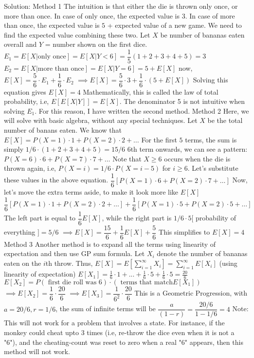\begin{enumerate}
Solution: Method 1
The intuition is that either the die is thrown only once, or more than once. In case of only once, the expected value is $3$.
In case of more than once, the expected value is $5$ + expected value of a new game. We need to find the expected value combining these two.
Let $X$ be number of bananas eaten overall  and $Y$ = number shown on the first dice.
$E_1 = E[X | \text{only once}] = E[X | Y < 6] = \dfrac{1}{5}(1+2+3+4+5) = 3$
$E_2 = E[ X | \text{more than once}] = E[X | Y=6] = 5 + E[X]$
now, $E[X] =  \dfrac{5}{6}\cdot E_1 + \dfrac{1}{6} \cdot E_2$
$\implies E[X] = \dfrac{5}{6} \cdot 3 + \dfrac{1}{6} \cdot (5 + E[X])$
Solving this equation gives $E[X] = 4$
Mathematically, this is called the law of total probability, i.e, $E[ E[X|Y] ] = E[X]$.
The denominator 5 is not intuitive when solving $E_1$. For this reason, I have written the second method.
Method 2
Here, we will solve with basic algebra, without any special techniques.
Let $X$ be the total number of banans eaten.
We know that $E[X]= P(X=1)\cdot 1 + P(X=2) \cdot 2 + \ldots$
For the first $5$ terms, the sum is simply $1/6 \cdot (1+2+3+4+5) = 15/6$
$6$th term onwards, we can see a pattern:
$P(X=6)  \cdot 6 + P(X=7) \cdot 7 + \ldots$
Note that $X\ge 6$ occurs when the die is thrown again, i.e, $P(X=i) = 1/6 \cdot P(X=i - 5)$ for $i\ge 6$.
Let's substitute these values in the above equation.
$ \dfrac{1}{6} [ P(X=1)  \cdot 6 + P(X=2) \cdot 7 + \ldots  ]$
Now, let's move the extra terms aside, to make it look more like $E[X]$
$ \dfrac{1}{6}  [ P(X=1) \cdot 1 + P(X=2) \cdot 2 + \ldots ]  + \dfrac{1}{6} [P(X=1) \cdot 5 + P(X=2) \cdot 5 + \ldots]$
The left part is equal to $\dfrac{1}{6} E[X]$, while the right part is $1/6 \cdot 5 [$ probability of everything $] = 5/6 $
$\implies  E[X] = \dfrac{15}{6} + \dfrac{1}{6}E[X] + \dfrac{5}{6}$
This simplifies to $E[X] = 4$
Method 3
Another method is to expand all the terms using linearity of expectation and then use GP sum formula.
Let $X_i$ denote the number of bananas eaten on the $i$th throw.
Thus, $E[X] = E[\sum_{i=1}^{\infty} X_i] = \sum_{i=1}^{\infty} E[X_i]$ (using linearity of expectation)
$E[X_1] = \frac{1}{6} \cdot 1 + ... + \frac{1}{6}  \cdot 5 + \frac{1}{6}  \cdot 5 = \frac{20}{6}$
$E[X_2] = P(\text{ first die roll was 6} ) \cdot (\text{ terms that match} E[X_1])$
$\implies E[X_2] = \dfrac{1}{6} \cdot \dfrac{20}{6}$
$\implies E[X_3] = \dfrac{1}{6^2} \cdot \dfrac{20}{6}$
This is a Geometric Progression, with $a = 20/6, r=1/6$, the sum of infinite terms will be $\dfrac{a}{(1-r)} = \dfrac{20/6}{1-1/6} = 4$
Note: This will not work for a problem that involves a state. For instance, if the monkey could cheat upto 3 times (i.e, re-throw the dice even when it is not a "6"), and the cheating-count was reset to zero when a real "6" appears, then this method will not work.




\end{enumerate}

